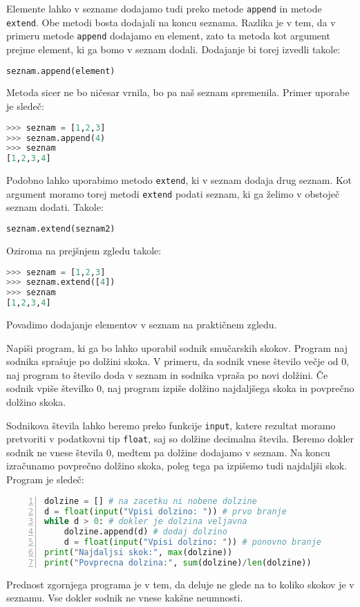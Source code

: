 Elemente lahko v sezname dodajamo tudi preko metode \texttt{append} in metode \texttt{extend}. Obe metodi bosta dodajali na koncu seznama. Razlika je v tem, da v primeru metode \texttt{append} dodajamo en element, zato ta metoda kot argument prejme element, ki ga bomo v seznam dodali. Dodajanje bi torej izvedli takole:
\begin{lstlisting}[language=Python, showstringspaces=false]
seznam.append(element)
\end{lstlisting}
Metoda sicer ne bo ničesar vrnila, bo pa naš seznam spremenila. Primer uporabe je sledeč:
\begin{lstlisting}[language=Python, showstringspaces=false]
>>> seznam = [1,2,3]
>>> seznam.append(4)
>>> seznam
[1,2,3,4]
\end{lstlisting}
Podobno lahko uporabimo metodo \texttt{extend}, ki v seznam dodaja drug seznam. Kot argument moramo torej metodi \texttt{extend} podati seznam, ki ga želimo v obstoječ seznam dodati. Takole:
\begin{lstlisting}[language=Python, showstringspaces=false]
seznam.extend(seznam2)
\end{lstlisting}
Oziroma na prejšnjem zgledu takole:
\begin{lstlisting}[language=Python, showstringspaces=false]
>>> seznam = [1,2,3]
>>> seznam.extend([4])
>>> seznam
[1,2,3,4]
\end{lstlisting}

Povadimo dodajanje elementov v seznam na praktičnem zgledu.
\begin{zgled}
Napiši program, ki ga bo lahko uporabil sodnik smučarskih skokov. Program naj sodnika sprašuje po dolžini skoka. V primeru, da sodnik vnese število večje od 0, naj program to število doda v seznam in sodnika vpraša po novi dolžini. Če sodnik vpiše številko 0, naj program izpiše dolžino najdaljšega skoka in povprečno dolžino skoka.
\end{zgled}
\begin{resitev}
Sodnikova števila lahko beremo preko funkcije \texttt{input}, katere rezultat moramo pretvoriti v podatkovni tip \texttt{float}, saj so dolžine decimalna števila. Beremo dokler sodnik ne vnese števila 0, medtem pa dolžine dodajamo v seznam. Na koncu izračunamo povprečno dolžino skoka, poleg tega pa izpišemo tudi najdaljši skok. Program je sledeč:
\begin{lstlisting}[language=Python, showstringspaces=false,numbers=left]
dolzine = [] # na zacetku ni nobene dolzine
d = float(input("Vpisi dolzino: ")) # prvo branje
while d > 0: # dokler je dolzina veljavna
    dolzine.append(d) # dodaj dolzino
    d = float(input("Vpisi dolzino: ")) # ponovno branje
print("Najdaljsi skok:", max(dolzine))
print("Povprecna dolzina:", sum(dolzine)/len(dolzine))
\end{lstlisting}
\end{resitev}
Prednost zgornjega programa je v tem, da deluje ne glede na to koliko skokov je v seznamu. Vse dokler sodnik ne vnese kakšne neumnosti.

